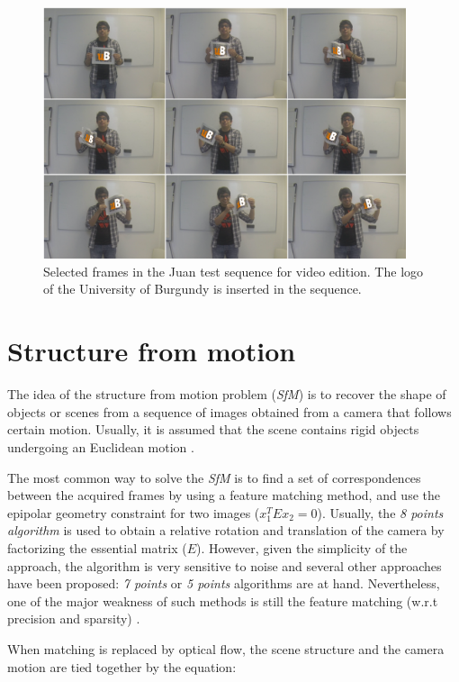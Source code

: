    \begin{figure}[tpbh]
      \centering
      \includegraphics[width=0.95\textwidth]{../images/longUB.png}
      \caption{  Selected frames in the Juan test sequence for video edition. The logo of the University of Burgundy is inserted in the sequence. }
      \label{pt_seg2}
   \end{figure}

\section{Structure from motion}

The idea of the structure from motion problem ({\it SfM}) is to 
recover the shape of objects or scenes from a sequence of images obtained from a camera that follows certain motion. Usually, it is assumed that 
the scene contains rigid objects undergoing an 
Euclidean motion \cite{c43}.

The most common way to solve the {\it SfM} is to 
find a set of correspondences between the acquired 
frames by using a feature matching method, and use the epipolar geometry constraint for two images 
($x_1^T E x_2 = 0$). Usually, the {\it 8 points algorithm} is used to obtain a relative rotation 
and translation of the camera by factorizing the 
essential matrix ($E$). However, given the simplicity of the approach, the algorithm is very sensitive to noise and several other approaches have 
been proposed: {\it 7 points} or {\it 5 points} algorithms are at hand. Nevertheless, one of the major weakness of such 
methods is still the feature matching (w.r.t precision and sparsity) \cite{c43}. 

When matching is replaced by optical flow, the 
scene structure and the camera motion are tied 
together by the equation:

